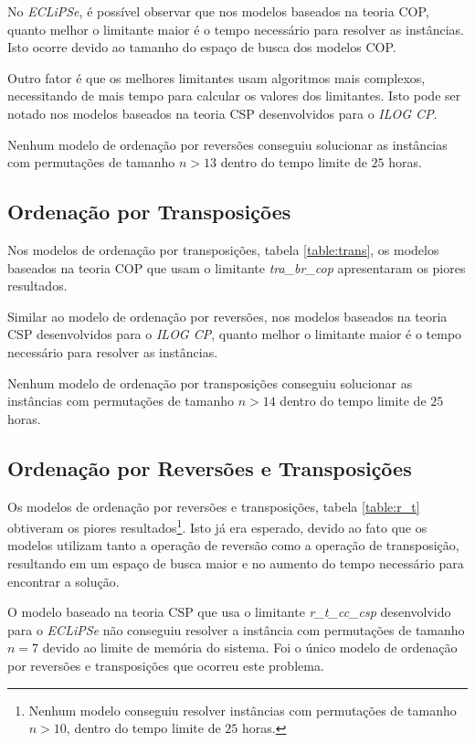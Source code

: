 No \textit{ECLiPSe}, é possível observar que nos modelos baseados na
teoria COP, quanto melhor o limitante maior é o tempo necessário para
resolver as instâncias. Isto ocorre devido ao tamanho do espaço de
busca dos modelos COP. 

Outro fator é que os melhores limitantes usam algoritmos mais
complexos, necessitando de mais tempo para calcular os valores dos
limitantes. Isto pode ser notado nos modelos baseados na teoria CSP
desenvolvidos para o \textit{ILOG CP}.

Nenhum modelo de ordenação por reversões conseguiu solucionar as
instâncias com permutações de tamanho $n > 13$ dentro do tempo limite
de $25$ horas.



\subsection{Ordenação por Transposições}
\label{subsec:analise_tra}
Nos modelos de ordenação por transposições, tabela \ref{table:trans},
os modelos baseados na teoria COP que usam o
limitante \textit{tra\_br\_cop} apresentaram os piores resultados.

Similar ao modelo de ordenação por reversões, nos modelos baseados na
teoria CSP desenvolvidos para o \textit{ILOG CP}, quanto melhor o
limitante maior é o tempo necessário para resolver as instâncias.

Nenhum modelo de ordenação por transposições conseguiu solucionar as
instâncias com permutações de tamanho $n > 14$ dentro do tempo limite
de $25$ horas.



\subsection{Ordenação por Reversões e Transposições}
\label{subsec:analise_r_t}
Os modelos de ordenação por reversões e transposições,
tabela \ref{table:r_t} obtiveram os piores resultados\footnote{Nenhum
modelo conseguiu resolver instâncias com permutações de tamanho $n >
10$, dentro do tempo limite de $25$ horas.}. Isto já era esperado,
devido ao fato que os modelos utilizam tanto a operação de reversão
como a operação de transposição, resultando em um espaço de busca
maior e no aumento do tempo necessário para encontrar a solução.

O modelo baseado na teoria CSP que usa o
limitante \textit{r\_t\_cc\_csp} desenvolvido para o \textit{ECLiPSe}
não conseguiu resolver a instância com permutações de tamanho $n = 7$
devido ao limite de memória do sistema. Foi o único modelo de
ordenação por reversões e transposições que ocorreu este problema.

